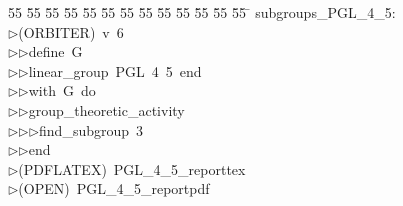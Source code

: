 %
%
\begin{tabbing}
55 \= 55 \= 55 \= 55 \= 55 \= 55 \= 55 \= 55 \= 55 \= 55 \= 55 \= 55 \= 55 \= \kill
subgroups\_PGL\_4\_5:\\[0pt]
$\triangleright$\>(ORBITER)\ v\ 6\ \\[0pt]
$\triangleright$\>$\triangleright$\>define\ G\ \\[0pt]
$\triangleright$\>$\triangleright$\>linear\_group\ PGL\ 4\ 5\ end\ \\[0pt]
$\triangleright$\>$\triangleright$\>with\ G\ do\ \\[0pt]
$\triangleright$\>$\triangleright$\>group\_theoretic\_activity\ \\[0pt]
$\triangleright$\>$\triangleright$\>$\triangleright$\>find\_subgroup\ 3\ \\[0pt]
$\triangleright$\>$\triangleright$\>end\\[0pt]
$\triangleright$\>(PDFLATEX)\ PGL\_4\_5\_reporttex\\[0pt]
$\triangleright$\>(OPEN)\ PGL\_4\_5\_reportpdf\\[0pt]
\end{tabbing}
